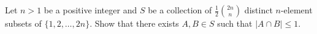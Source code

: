 Let $n > 1$ be a positive integer and $S$ be a collection of $\frac{1}{2}\binom{2n}{n}$ distinct $n$-element subsets of $\{1, 2, \dotsc, 2n\}$. Show that there exists $A, B\in S$ such that $|A\cap B|\leq 1$.

